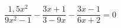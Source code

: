 \begin{ex}[type=equation]
	\begin{condition}
		$\dfrac{1,5x^2}{9x^2 - 1} - \dfrac{3x + 1}{3 - 9x} - \dfrac{3x - 1}{6x + 2} = 0$
	\end{condition}
\end{ex}